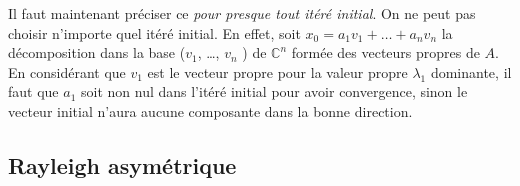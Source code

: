 Il faut maintenant préciser ce \textit{pour presque tout itéré initial}. On ne peut pas choisir n'importe quel itéré initial. En effet, soit $x_0 = a_1 v_1 + \ldots + a_n v_n $ la décomposition dans la base ($v_1$, \ldots , $v_n$ ) de $\mathbb{C}^n$ formée des vecteurs propres de $A$. En considérant que $v_1$ est le vecteur propre pour la valeur propre $\lambda_1$ dominante, il faut que $a_1$ soit non nul dans l'itéré initial pour avoir convergence, sinon le vecteur initial n'aura aucune composante dans la bonne direction.   

\subsection*{Rayleigh asymétrique}